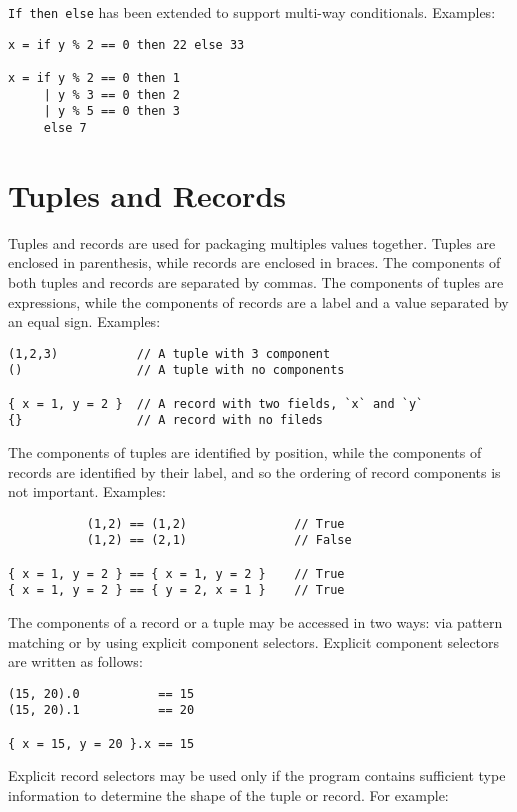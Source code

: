 \texttt{If then else} has been extended to support multi-way
conditionals. Examples:

\begin{verbatim}
x = if y % 2 == 0 then 22 else 33

x = if y % 2 == 0 then 1
     | y % 3 == 0 then 2
     | y % 5 == 0 then 3
     else 7
\end{verbatim}

\section{Tuples and Records}\label{tuples-and-records}

Tuples and records are used for packaging multiples values together.
Tuples are enclosed in parenthesis, while records are enclosed in
braces. The components of both tuples and records are separated by
commas. The components of tuples are expressions, while the components
of records are a label and a value separated by an equal sign. Examples:

\begin{verbatim}
(1,2,3)           // A tuple with 3 component
()                // A tuple with no components

{ x = 1, y = 2 }  // A record with two fields, `x` and `y`
{}                // A record with no fileds
\end{verbatim}

The components of tuples are identified by position, while the
components of records are identified by their label, and so the ordering
of record components is not important. Examples:

\begin{verbatim}
           (1,2) == (1,2)               // True
           (1,2) == (2,1)               // False

{ x = 1, y = 2 } == { x = 1, y = 2 }    // True
{ x = 1, y = 2 } == { y = 2, x = 1 }    // True
\end{verbatim}

The components of a record or a tuple may be accessed in two ways: via
pattern matching or by using explicit component selectors. Explicit
component selectors are written as follows:

\begin{verbatim}
(15, 20).0           == 15
(15, 20).1           == 20

{ x = 15, y = 20 }.x == 15
\end{verbatim}

Explicit record selectors may be used only if the program contains
sufficient type information to determine the shape of the tuple or
record. For example:

